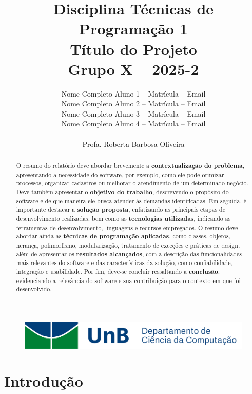 \documentclass{article}
\title{
    \fontsize{22}{24}\selectfont \textbf{Disciplina Técnicas de Programação 1} \\[1em]
    \fontsize{20}{22}\selectfont \textbf{Título do Projeto} \\[1em]
    \fontsize{12}{14}\selectfont Grupo X  -- 2025-2 \\%
}
\author{
    Nome Completo Aluno 1 -- Matrícula -- Email \\ 
    Nome Completo Aluno 2 -- Matrícula -- Email \\ 
    Nome Completo Aluno 3 -- Matrícula -- Email \\
    Nome Completo Aluno 4 -- Matrícula -- Email \\
    \\Profa. Roberta Barbosa Oliveira
}
\date{}
\begin{document}
\begin{figure}
    \centering
    \includegraphics[width=0.5\linewidth]{logo_cic.png}
\end{figure}

\maketitle
\fontsize{12}{15}\selectfont %
\sectionfont{\fontsize{14}{18}\selectfont} %
\titlespacing{\section}{0pt}{30pt}{10pt} %

\begin{abstract} 
\noindent 
O resumo do relatório deve abordar brevemente a \textbf{contextualização do problema}, apresentando a necessidade do software, por exemplo, como ele pode otimizar processos, organizar cadastros ou melhorar o atendimento de um determinado negócio. Deve também apresentar o \textbf{objetivo do trabalho}, descrevendo o propósito do software e de que maneira ele busca atender às demandas identificadas. Em seguida, é importante destacar a \textbf{solução proposta}, enfatizando as principais etapas de desenvolvimento realizadas, bem como as \textbf{tecnologias utilizadas}, indicando as ferramentas de desenvolvimento, linguagens e recursos empregados. O resumo deve abordar ainda as \textbf{técnicas de programação aplicadas}, como classes, objetos, herança, polimorfismo, modularização, tratamento de exceções e práticas de design, além de apresentar os \textbf{resultados alcançados}, com a descrição das funcionalidades mais relevantes do software e das características da solução, como confiabilidade, integração e usabilidade. Por fim, deve-se concluir ressaltando a \textbf{conclusão}, evidenciando a relevância do software e sua contribuição para o contexto em que foi desenvolvido.

\end{abstract}

\section{Introdução}
\label{sec:introducao}
\end{document}
